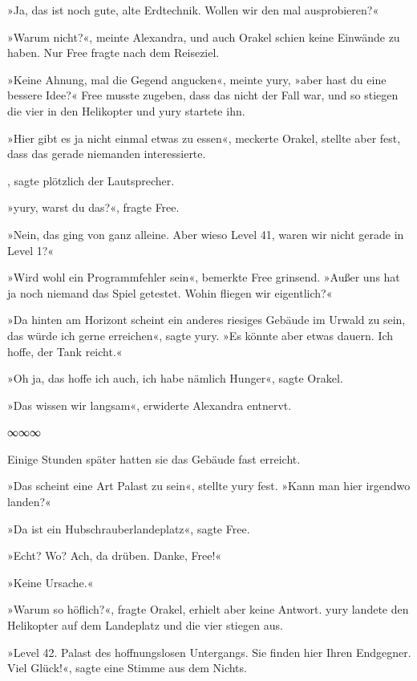 »Ja, das ist noch gute, alte Erdtechnik. Wollen wir den mal ausprobieren?«

»Warum nicht?«, meinte Alexandra, und auch Orakel schien keine Einwände zu haben. Nur Free fragte nach dem Reiseziel.

»Keine Ahnung, mal die Gegend angucken«, meinte yury, »aber hast du eine bessere Idee?« Free musste zugeben, dass das nicht der Fall war, und so stiegen die vier in den Helikopter und yury startete ihn.

»Hier gibt es ja nicht einmal etwas zu essen«, meckerte Orakel, stellte aber fest, dass das gerade niemanden interessierte.

, sagte plötzlich der Lautsprecher.

»yury, warst du das?«, fragte Free.

»Nein, das ging von ganz alleine. Aber wieso Level 41, waren wir nicht gerade in Level 1?«

»Wird wohl ein Programmfehler sein«, bemerkte Free grinsend. »Außer uns hat ja noch niemand das Spiel getestet. Wohin fliegen wir eigentlich?«

»Da hinten am Horizont scheint ein anderes riesiges Gebäude im Urwald zu sein, das würde ich gerne erreichen«, sagte yury. »Es könnte aber etwas dauern. Ich hoffe, der Tank reicht.«

»Oh ja, das hoffe ich auch, ich habe nämlich Hunger«, sagte Orakel.

»Das wissen wir langsam«, erwiderte Alexandra entnervt.

\begin{center}
    ∞∞∞
\end{center}

Einige Stunden später hatten sie das Gebäude fast erreicht.

»Das scheint eine Art Palast zu sein«, stellte yury fest. »Kann man hier irgendwo landen?«

»Da ist ein Hubschrauberlandeplatz«, sagte Free.

»Echt? Wo? Ach, da drüben. Danke, Free!«

»Keine Ursache.«

»Warum so höflich?«, fragte Orakel, erhielt aber keine Antwort. yury landete den Helikopter auf dem Landeplatz und die vier stiegen aus.

»Level 42. Palast des hoffnungslosen Untergangs. Sie finden hier Ihren Endgegner. Viel Glück!«, sagte eine Stimme aus dem Nichts.

